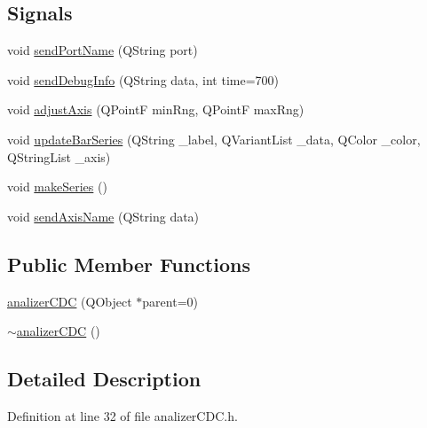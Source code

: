 \subsection*{Signals}
\begin{DoxyCompactItemize}
\item 
void \hyperlink{classanalizer_c_d_c_a7965494015282fce03472e6689ae94cb}{send\+Port\+Name} (Q\+String port)
\item 
void \hyperlink{classanalizer_c_d_c_aa599eb23f4963cf03ab4a144e98c9082}{send\+Debug\+Info} (Q\+String data, int time=700)
\item 
void \hyperlink{classanalizer_c_d_c_ab7c585d83e9a58e528a4aa97c3089bf4}{adjust\+Axis} (Q\+Point\+F min\+Rng, Q\+Point\+F max\+Rng)
\item 
void \hyperlink{classanalizer_c_d_c_a37e681c3d7303e1fb4a5158e32190a5a}{update\+Bar\+Series} (Q\+String \+\_\+label, Q\+Variant\+List \+\_\+data, Q\+Color \+\_\+color, Q\+String\+List \+\_\+axis)
\item 
void \hyperlink{classanalizer_c_d_c_a132b531865b1693e14b75882c8a9b7ee}{make\+Series} ()
\item 
void \hyperlink{classanalizer_c_d_c_a530498433b5c1d80d8fce61d2b5c0931}{send\+Axis\+Name} (Q\+String data)
\end{DoxyCompactItemize}
\subsection*{Public Member Functions}
\begin{DoxyCompactItemize}
\item 
\hyperlink{classanalizer_c_d_c_aa688dbe61f982d00a744d0bbf5e6f167}{analizer\+C\+D\+C} (Q\+Object $\ast$parent=0)
\item 
\hyperlink{classanalizer_c_d_c_a4c740159d20989db81fec1c4893c8fd5}{$\sim$analizer\+C\+D\+C} ()
\end{DoxyCompactItemize}


\subsection{Detailed Description}


Definition at line 32 of file analizer\+C\+D\+C.\+h.



